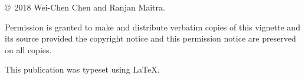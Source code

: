 
\null
\vfill
\copyright\ 2018 Wei-Chen Chen and Ranjan Maitra.

Permission is granted to make and distribute verbatim copies of
this vignette and its source provided the copyright notice and
this permission notice are preserved on all copies.

This publication was typeset using \LaTeX.
